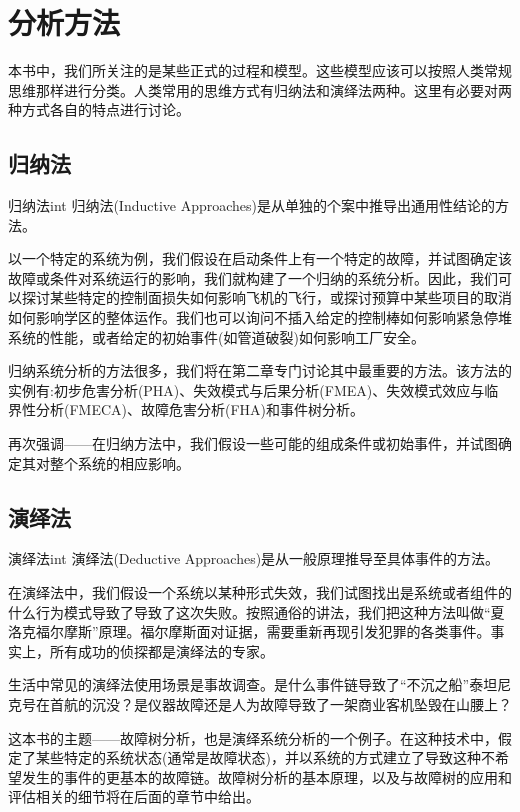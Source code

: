 \documentclass[cn,11pt,chinese]{elegantbook}
\begin{document}
\section{分析方法}

本书中，我们所关注的是某些正式的过程和模型。这些模型应该可以按照人类常规思维那样进行分类。人类常用的思维方式有归纳法和演绎法两种。这里有必要对两种方式各自的特点进行讨论。

\subsection{归纳法}

\begin{definition}{归纳法}{int}
	归纳法(Inductive Approaches)是从单独的个案中推导出通用性结论的方法。
\end{definition}

以一个特定的系统为例，我们假设在启动条件上有一个特定的故障，并试图确定该故障或条件对系统运行的影响，我们就构建了一个归纳的系统分析。因此，我们可以探讨某些特定的控制面损失如何影响飞机的飞行，或探讨预算中某些项目的取消如何影响学区的整体运作。我们也可以询问不插入给定的控制棒如何影响紧急停堆系统的性能，或者给定的初始事件(如管道破裂)如何影响工厂安全。

归纳系统分析的方法很多，我们将在第二章专门讨论其中最重要的方法。该方法的实例有:初步危害分析(PHA)、失效模式与后果分析(FMEA)、失效模式效应与临界性分析(FMECA)、故障危害分析(FHA)和事件树分析。

再次强调——在归纳方法中，我们假设一些可能的组成条件或初始事件，并试图确定其对整个系统的相应影响。

\subsection{演绎法}

\begin{definition}{演绎法}{int}
	演绎法(Deductive Approaches)是从一般原理推导至具体事件的方法。\end{definition}

在演绎法中，我们假设一个系统以某种形式失效，我们试图找出是系统或者组件的什么行为模式导致了导致了这次失败。按照通俗的讲法，我们把这种方法叫做“夏洛克福尔摩斯”原理。福尔摩斯面对证据，需要重新再现引发犯罪的各类事件。事实上，所有成功的侦探都是演绎法的专家。

生活中常见的演绎法使用场景是事故调查。是什么事件链导致了“不沉之船”泰坦尼克号在首航的沉没？是仪器故障还是人为故障导致了一架商业客机坠毁在山腰上？

这本书的主题——故障树分析，也是演绎系统分析的一个例子。在这种技术中，假定了某些特定的系统状态(通常是故障状态)，并以系统的方式建立了导致这种不希望发生的事件的更基本的故障链。故障树分析的基本原理，以及与故障树的应用和评估相关的细节将在后面的章节中给出。
\end{document}
